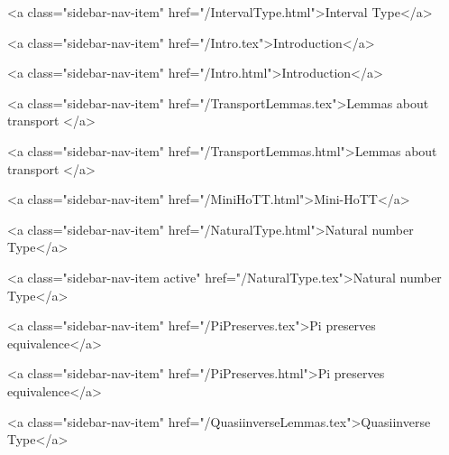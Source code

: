       
    
      
        
          <a class="sidebar-nav-item" href="/IntervalType.html">Interval Type</a>
        
      
    
      
        
          <a class="sidebar-nav-item" href="/Intro.tex">Introduction</a>
        
      
    
      
        
          <a class="sidebar-nav-item" href="/Intro.html">Introduction</a>
        
      
    
      
        
          <a class="sidebar-nav-item" href="/TransportLemmas.tex">Lemmas about transport </a>
        
      
    
      
        
          <a class="sidebar-nav-item" href="/TransportLemmas.html">Lemmas about transport </a>
        
      
    
      
        
          <a class="sidebar-nav-item" href="/MiniHoTT.html">Mini-HoTT</a>
        
      
    
      
        
          <a class="sidebar-nav-item" href="/NaturalType.html">Natural number Type</a>
        
      
    
      
        
          <a class="sidebar-nav-item active" href="/NaturalType.tex">Natural number Type</a>
        
      
    
      
        
          <a class="sidebar-nav-item" href="/PiPreserves.tex">Pi preserves equivalence</a>
        
      
    
      
        
          <a class="sidebar-nav-item" href="/PiPreserves.html">Pi preserves equivalence</a>
        
      
    
      
        
          <a class="sidebar-nav-item" href="/QuasiinverseLemmas.tex">Quasiinverse Type</a>
        
